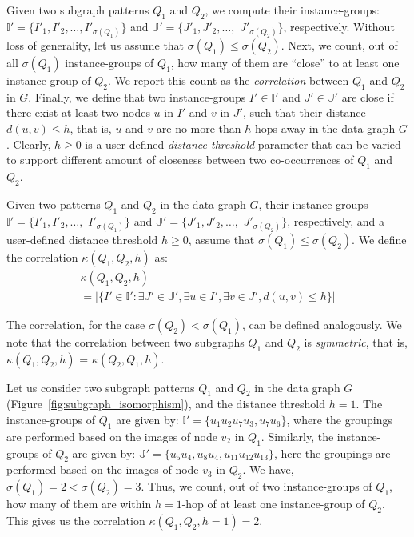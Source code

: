 Given two subgraph patterns $Q_1$ and $Q_2$, we compute their instance-groups:
$\mathbb{I'}=\{I'_1,I'_2,\ldots,I'_{\sigma(Q_1)}\}$ and $\mathbb{J'}=\{J'_1,J'_2,\ldots,$ $J'_{\sigma(Q_2)}\}$,
respectively. Without loss of generality, let us assume that $\sigma(Q_1) \le \sigma(Q_2)$.
Next, we count, out of all $\sigma(Q_1)$  instance-groups of $Q_1$, how many of them are ``close'' to at least
one instance-group of $Q_2$. We report this count as the {\em correlation} between $Q_1$ and $Q_2$ in $G$.
Finally, we define that two instance-groups $I' \in \mathbb{I'}$ and $J' \in \mathbb{J'}$
are close if there exist at least two nodes $u$ in $I'$ and $v$ in $J'$, such that their distance $d(u,v)\le h$,
that is, $u$ and $v$ are no more than $h$-hops away in the data graph $G$.
Clearly, $h\ge 0$ is a user-defined {\em distance threshold} parameter that can be varied to support different
amount of closeness between two co-occurrences of $Q_1$ and $Q_2$.
%
\begin{defn}[Correlation]
\label{def:correlation}
Given two patterns $Q_1$ and $Q_2$ in the data graph $G$, their instance-groups
$\mathbb{I'}=\{I'_1,I'_2,\ldots,$ $I'_{\sigma(Q_1)}\}$ and $\mathbb{J'}=\{J'_1,J'_2,\ldots,$ $J'_{\sigma(Q_2)}\}$,
respectively, and a user-defined distance threshold $h\ge0$,
assume that $\sigma(Q_1) \le \sigma(Q_2)$. We define the correlation
$\kappa(Q_1,Q_2,h)$ as:
%
\begin{align}
&\kappa(Q_1,Q_2,h) \nonumber & \\
&= |\{I' \in \mathbb{I'}:\exists J' \in \mathbb{J'}, \exists u \in I', \exists v \in J', d(u,v)\le h\}| \nonumber &
\end{align}
\end{defn}

The correlation, for the case $\sigma(Q_2) < \sigma(Q_1)$, can be defined analogously.
We note that the correlation between two subgraphs $Q_1$ and $Q_2$ is {\em symmetric}, that is,
$\kappa(Q_1,Q_2,h)$ = $\kappa(Q_2,Q_1,h)$.
%
\begin{exple}
Let us consider two subgraph patterns $Q_1$ and $Q_2$ in the data graph $G$ (Figure~\ref{fig:subgraph_isomorphism}),
and the distance threshold $h=1$. The instance-groups of $Q_1$ are given by: $\mathbb{I'}=\{u_1u_2u_7u_3,u_7u_6\}$,
where the groupings are performed based on the images of node $v_2$ in $Q_1$. Similarly,
the instance-groups of $Q_2$ are given by: $\mathbb{J'}=\{u_5u_4, u_8u_4,u_{11}u_{12}u_{13}\}$,
here the groupings are performed based on the images of node $v_3$ in $Q_2$. We have,
$\sigma(Q_1) =2 < \sigma(Q_2) =3$. Thus, we count, out
of two instance-groups of $Q_1$, how many of them are within $h=1$-hop of at least
one instance-group of $Q_2$. This gives us the correlation $\kappa(Q_1,Q_2,h=1)=2$.
\end{exple}

